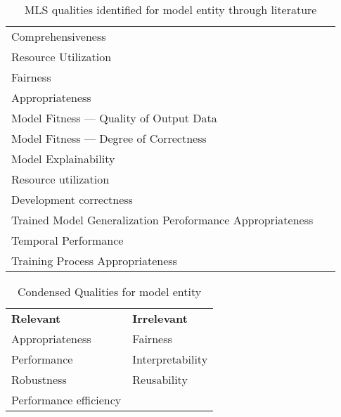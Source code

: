 \begin{table}[h]
\begin{tabular}{p{} p{}}
        Comprehensiveness &~\cite{ashmore_assuring_2021} \\
        Resource Utilization &~\cite{nakamichi_requirements-driven_2020} \\
        Fairness &~\cite{siebert_construction_2021, zhang_machine_2020} \\
        Appropriateness &~\cite{siebert_construction_2021} \\
        Model Fitness --- Quality of Output Data &~\cite{nakamichi_requirements-driven_2020} \\
        Model Fitness --- Degree of Correctness &~\cite{nakamichi_requirements-driven_2020,
                                                    zhang_machine_2020} \\
        Model Explainability &~\cite{vogelsang_requirements_2019} \\
        Resource utilization &~\cite{siebert_construction_2021} \\
        Development correctness &~\cite{siebert_construction_2021} \\
        Trained Model Generalization Peroformance Appropriateness
                                                    &~\cite{nakamichi_requirements-driven_2020} \\
        Temporal Performance &~\cite{nakamichi_requirements-driven_2020} \\
        Training Process Appropriateness &~\cite{nakamichi_requirements-driven_2020} \\
    \end{tabular}
    \caption{\ac{MLS} qualities identified for model entity through literature}
\end{table}

\begin{table}[h]\label{tb:literatureQualities}
    \centering
    \begin{tabular}{l l}
        \textbf{Relevant}                & \textbf{Irrelevant} \\
        Appropriateness         & Fairness  \\
        Performance             & Interpretability \\
        Robustness              & Reusability \\
        Performance efficiency  & \\
    \end{tabular}
    \caption{Condensed Qualities for model entity}
\end{table}

